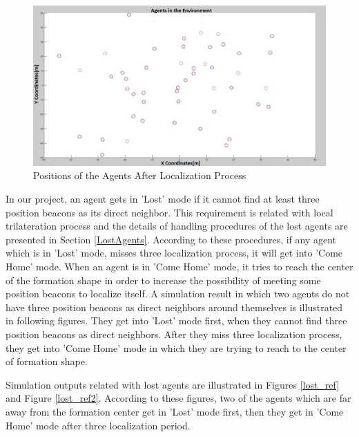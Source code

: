 \begin{figure}[H]
\centering
\captionsetup{format=hang,justification=centerfirst}
\caption{Positions of the Agents After Localization Process} \label{duzgun_pos_ref}
\centerline{\includegraphics[scale = 0.25]{Pozisyon-1-Duzeltilmis}}
\end{figure} 

In our project, an agent gets in 'Lost' mode if it cannot find at least three position beacons as its direct neighbor. This requirement is related with local trilateration process and the details of handling procedures of the lost agents are presented in Section \ref{LostAgents}. According to these procedures, if any agent which is in 'Lost' mode, misses three localization process, it will get into 'Come Home' mode. When an agent is in 'Come Home' mode, it tries to reach the center of the formation shape in order to increase the possibility of meeting some position beacons to localize itself. A simulation result in which two agents do not have three position beacons as direct neighbors around themselves is illustrated in following figures. They get into 'Lost' mode first, when they cannot find three position beacons as direct neighbors. After they miss three localization process, they get into 'Come Home' mode in which they are trying to reach to the center of formation shape.

Simulation outputs related with lost agents are illustrated in Figures \ref{lost_ref} and Figure \ref{lost_ref2}. According to these figures, two of the agents which are far away from the formation center get in 'Lost' mode first, then they get in 'Come Home' mode after three localization period. 
		
